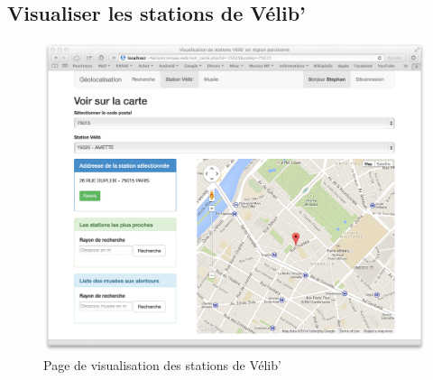 \documentclass[a4paper]{article}
\begin{document}
\subsection{Visualiser les stations de Vélib'}
\begin{figure}[!h]
\centering
\includegraphics[scale=0.3,keepaspectratio=TRUE]{velib}
\caption{Page de visualisation des stations de Vélib'}
\end{figure}
\end{document}
